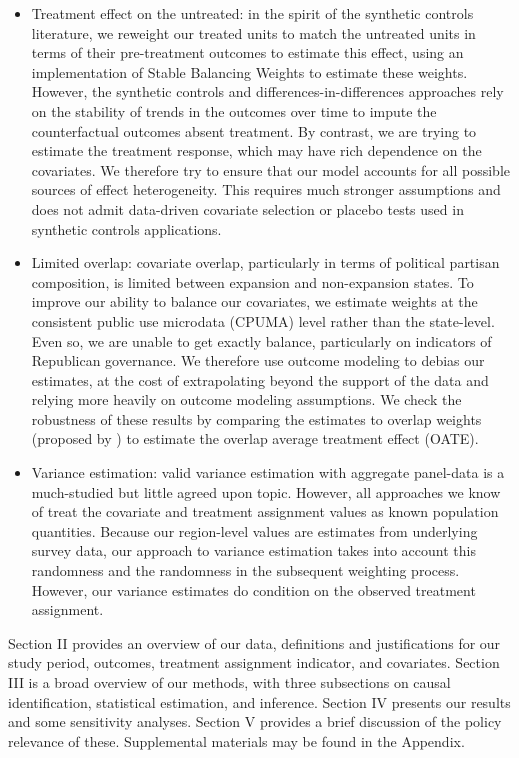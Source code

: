 \documentclass[12pt]{article}
\begin{document}
\begin{itemize}
    \item Treatment effect on the untreated: in the spirit of the synthetic controls literature, we reweight our treated units to match the untreated units in terms of their pre-treatment outcomes to estimate this effect, using an implementation of \cite{zubizarreta2015stable} Stable Balancing Weights to estimate these weights. However, the synthetic controls and differences-in-differences approaches rely on the stability of trends in the outcomes over time to impute the counterfactual outcomes absent treatment. By contrast, we are trying to estimate the treatment response, which may have rich dependence on the covariates. We therefore try to ensure that our model accounts for all possible sources of effect heterogeneity. This requires much stronger assumptions and does not admit data-driven covariate selection or placebo tests used in synthetic controls applications.
    \item Limited overlap: covariate overlap, particularly in terms of political partisan composition, is limited between expansion and non-expansion states. To improve our ability to balance our covariates, we estimate weights at the consistent public use microdata (CPUMA) level rather than the state-level. Even so, we are unable to get exactly balance, particularly on indicators of Republican governance. We therefore use outcome modeling to debias our estimates, at the cost of extrapolating beyond the support of the data and relying more heavily on outcome modeling assumptions. We check the robustness of these results by comparing the estimates to overlap weights (proposed by \cite{li2018balancing}) to estimate the overlap average treatment effect (OATE). 
    \item Variance estimation: valid variance estimation with aggregate panel-data is a much-studied but little agreed upon topic. However, all approaches we know of treat the covariate and treatment assignment values as known population quantities. Because our region-level values are estimates from underlying survey data, our approach to variance estimation takes into account this randomness and the randomness in the subsequent weighting process. However, our variance estimates do condition on the observed treatment assignment.
\end{itemize}

Section II provides an overview of our data, definitions and justifications for our study period, outcomes, treatment assignment indicator, and covariates. Section III is a broad overview of our methods, with three subsections on causal identification, statistical estimation, and inference. Section IV presents our results and some sensitivity analyses. Section V provides a brief discussion of the policy relevance of these. Supplemental materials may be found in the Appendix.
\end{document}
